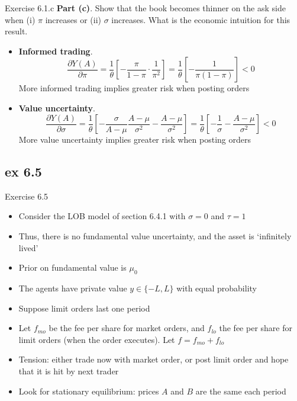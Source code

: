 \documentclass[english,10pt]{beamer}
\begin{document}
\begin{frame}{Exercise 6.1.c}
	\textbf{Part (c)}. Show that the book becomes thinner on the ask side when (i) $\pi$ increases or (ii) $\sigma$ increases. What is the economic intuition for this result.
	\smallskip
	\smallskip
	\begin{itemize}
		\item \textbf{Informed trading}. 
		\[
		\frac{\partial Y(A)}{\partial \pi} = \frac{1}{\theta}\left[ -\frac{\pi}{1-\pi}\cdot \frac{1}{\pi^2}\right]=\frac{1}{\theta}\left[ -\frac{1}{\pi(1-\pi)}\right]<0
		\]
		More informed trading implies greater risk when posting orders
		\item \textbf{Value uncertainty}. 
		\[
		\frac{\partial Y(A)}{\partial \sigma} = \frac{1}{\theta} \left[ -\frac{\sigma}{A-\mu}\frac{A-\mu}{\sigma^2} - \frac{A-\mu}{\sigma^2}\right]=\frac{1}{\theta} \left[ -\frac{1}{\sigma} - \frac{A-\mu}{\sigma^2}\right]<0
		\]
		More value uncertainty implies greater risk when posting orders \hyperlink{exercises}{}
	\end{itemize}
\end{frame}



\subsection{ex 6.5}

\begin{frame}[label=ex5]{Exercise 6.5}
	\begin{itemize}
		\item Consider the LOB model of section 6.4.1 with $\sigma=0$ and $\tau=1$
		\item Thus, there is no fundamental value uncertainty, and the asset is `infinitely lived'
		\item Prior on fundamental value is $\mu_0$
		\item The agents have private value $y \in \{-L,L\}$ with equal probability
		\item Suppose limit orders last one period
		\item Let $f_{mo}$ be the fee per share for market orders, and $f_{lo}$ the fee per share for limit orders (when the order executes). Let $f=f_{mo}+f_{lo}$
		\item Tension: either trade now with market order, or post limit order and hope that it is hit by next trader
		\item Look for stationary equilibrium: prices $A$ and $B$ are the same each period
	\end{itemize}
\end{frame}
\end{document}
